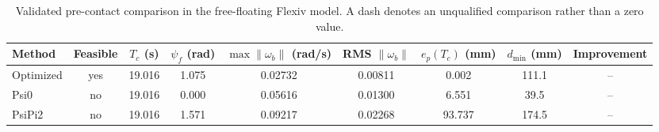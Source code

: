 \begin{table}[t]
\centering
\caption{Validated pre-contact comparison in the free-floating Flexiv model. A dash denotes an unqualified comparison rather than a zero value.}
\label{tab:precontact_comparison}
\begin{tabular}{lcccccccc}
\toprule
Method & Feasible & $T_c$ (s) & $\psi_f$ (rad) & $\max\|\omega_b\|$ (rad/s) & RMS $\|\omega_b\|$ & $e_p(T_c)$ (mm) & $d_{\min}$ (mm) & Improvement \\
\midrule
Optimized & yes & 19.016 & 1.075 & 0.02732 & 0.00811 & 0.002 & 111.1 & -- \\
Psi0 & no & 19.016 & 0.000 & 0.05616 & 0.01300 & 6.551 & 39.5 & -- \\
PsiPi2 & no & 19.016 & 1.571 & 0.09217 & 0.02268 & 93.737 & 174.5 & -- \\
\bottomrule
\end{tabular}
\end{table}
